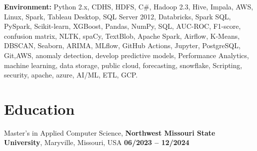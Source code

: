 \documentclass[11pt,letterpaper]{article}
\begin{document}
\textbf{Environment:} Python 2.x, CDHS, HDFS, C\#, Hadoop 2.3, Hive, Impala, AWS, Linux, Spark,
Tableau Desktop, SQL Server 2012, Databricks, Spark SQL, PySpark, Scikit-learn, XGBoost, Pandas,
NumPy, SQL, AUC-ROC, F1-score, confusion matrix, NLTK, spaCy, TextBlob, Apache Spark, Airflow,
K-Means, DBSCAN, Seaborn, ARIMA, MLflow, GitHub Actions, Jupyter, PostgreSQL, Git,AWS, anomaly
detection, develop predictive models, Performance Analytics, machine learning, data storage, public
cloud, forecasting, snowflake, Scripting, security, apache, azure, AI/ML, ETL, GCP.

\vspace{-20pt}
\section*{Education}
\vspace{-20pt}
\noindent Master's in Applied Computer Science, \textbf{Northwest Missouri State University},
Maryville, Missouri, USA \hfill \textbf{06/2023 -- 12/2024}
\end{document}
